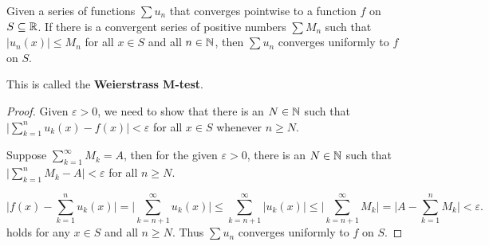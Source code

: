 \documentclass[a4paper]{ctexart}
\begin{document}
    \begin{mythm}
        Given a series of functions $\sum u_n$ that converges pointwise to a function $f$ on $S\subseteq \mathbb{R}$. If there is a convergent series of positive numbers $\sum M_n$ such that $|u_n(x)| \le M_n$ for all $x\in S$ and all $n\in \mathbb{N}$, then $\sum u_n$ converges uniformly to $f$ on $S$.
        
        This is called the \textbf{Weierstrass M-test}.
    \end{mythm}
    \begin{proof}
        Given $\varepsilon >0$, we need to show that there is an $N\in \mathbb{N}$ such that $\Big|\displaystyle \sum_{k=1}^n u_k(x) - f(x)\Big| < \varepsilon$ for all $x\in S$ whenever $n \ge N$.

        Suppose $\displaystyle \sum_{k=1}^\infty M_k=A$, then for the given $\varepsilon >0$, there is an $N\in \mathbb{N}$ such that $\displaystyle \Big| \sum_{k=1}^n M_k - A \Big| < \varepsilon$ for all $n \ge N$.

        $$ \Big|f(x) - \sum_{k=1}^n u_k(x)\Big| = \Big|\sum_{k=n+1}^\infty u_k(x)\Big| \le \sum_{k=n+1}^\infty |u_k(x)| \le \Big|\sum_{k=n+1}^\infty M_k \Big| = \Big| A - \sum_{k=1}^n M_k \Big| < \varepsilon. $$
        holds for any $x\in S$ and all $n \ge N$. Thus $\sum u_n$ converges uniformly to $f$ on $S$.
    \end{proof}
\end{document}
